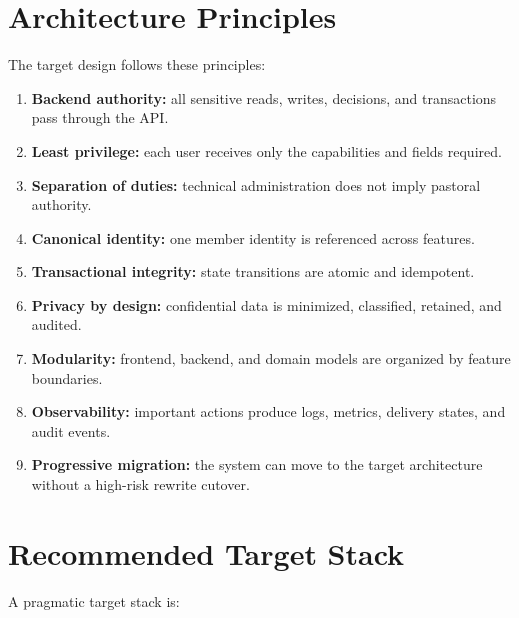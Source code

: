 \documentclass[11pt,a4paper,oneside]{report}
\begin{document}
\section{Architecture Principles}

The target design follows these principles:

\begin{enumerate}
  \item \textbf{Backend authority:} all sensitive reads, writes, decisions, and transactions pass through the API.
  \item \textbf{Least privilege:} each user receives only the capabilities and fields required.
  \item \textbf{Separation of duties:} technical administration does not imply pastoral authority.
  \item \textbf{Canonical identity:} one member identity is referenced across features.
  \item \textbf{Transactional integrity:} state transitions are atomic and idempotent.
  \item \textbf{Privacy by design:} confidential data is minimized, classified, retained, and audited.
  \item \textbf{Modularity:} frontend, backend, and domain models are organized by feature boundaries.
  \item \textbf{Observability:} important actions produce logs, metrics, delivery states, and audit events.
  \item \textbf{Progressive migration:} the system can move to the target architecture without a high-risk rewrite cutover.
\end{enumerate}

\section{Recommended Target Stack}

A pragmatic target stack is:
\end{document}
